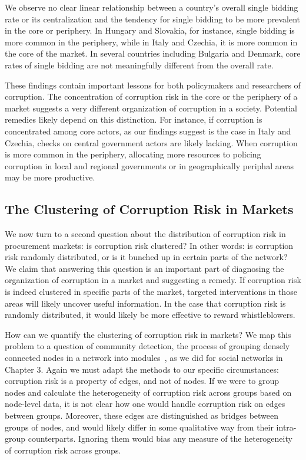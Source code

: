 We observe no clear linear relationship between a country's overall single bidding rate or its centralization and the tendency for single bidding to be more prevalent in the core or periphery. In Hungary and Slovakia, for instance, single bidding is more common in the periphery, while in Italy and Czechia, it is more common in the core of the market. In several countries including Bulgaria and Denmark, core rates of single bidding are not meaningfully different from the overall rate.

These findings contain important lessons for both policymakers and researchers of corruption. The concentration of corruption risk in the core or the periphery of a market suggests a very different organization of corruption in a society. Potential remedies likely depend on this distinction. For instance, if corruption is concentrated among core actors, as our findings suggest is the case in Italy and Czechia, checks on central government actors are likely lacking. When corruption is more common in the periphery, allocating more resources to policing corruption in local and regional governments or in geographically periphal areas may be more productive.

\subsection{The Clustering of Corruption Risk in Markets}
We now turn to a second question about the distribution of corruption risk in procurement markets: is corruption risk clustered? In other words: is corruption risk randomly distributed, or is it bunched up in certain parts of the network? We claim that answering this question is an important part of diagnosing the organization of corruption in a market and suggesting a remedy. If corruption risk is indeed clustered in specific parts of the market, targeted interventions in those areas will likely uncover useful information. In the case that corruption risk is randomly distributed, it would likely be more effective to reward whistleblowers.

How can we quantify the clustering of corruption risk in markets? We map this problem to a question of community detection, the process of grouping densely connected nodes in a network into modules~\cite{fortunato2010community}, as we did for social networks in Chapter 3. Again we must adapt the methods to our specific circumstances: corruption risk is a property of edges, and not of nodes. If we were to group nodes and calculate the heterogeneity of corruption risk across groups based on node-level data, it is not clear how one would handle corruption risk on edges between groups. Moreover, these edges are distinguished as bridges between groups of nodes, and would likely differ in some qualitative way from their intra-group counterparts. Ignoring them would bias any measure of the heterogeneity of corruption risk across groups.

